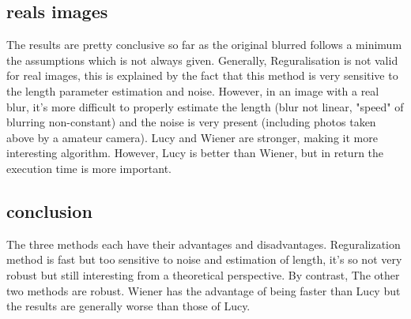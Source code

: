 
 

\subsection{reals images}

 
The results are pretty conclusive so far as the original blurred follows a minimum the assumptions which is not always given. Generally, Reguralisation is not valid for real images, this is explained by the fact that this method is very sensitive to the length parameter estimation and noise. However, in an image with a real blur, it's more difficult to properly estimate the length (blur not linear, "speed" of blurring non-constant) and the noise is very present (including photos taken above by a amateur camera). Lucy and Wiener are stronger, making it more interesting algorithm. However, Lucy is better than Wiener, but in return the execution time is more important.

\subsection{conclusion}

The three methods each have their advantages and disadvantages. Reguralization method is fast but too sensitive to noise and estimation of length, it's so not very robust but still interesting from a theoretical perspective. By contrast, The other two methods are robust. Wiener has the advantage of being faster than Lucy but the results are generally worse than those of Lucy.
